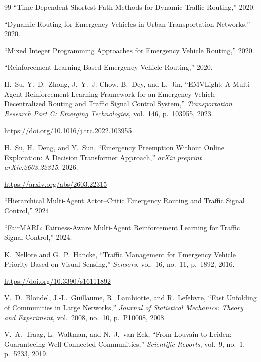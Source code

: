 \documentclass[3p,times]{elsarticle}
\theoremstyle{plain}
\theoremstyle{definition}
\begin{document}
\begin{thebibliography}{99}
``Time-Dependent Shortest Path Methods for Dynamic Traffic
Routing,''
2020.

``Dynamic Routing for Emergency Vehicles in Urban Transportation
Networks,''
2020.

``Mixed Integer Programming Approaches for Emergency Vehicle
Routing,''
2020.

``Reinforcement Learning-Based Emergency Vehicle Routing,''
2020.


H.~Su, Y.~D.~Zhong, J.~Y.~J. Chow, B.~Dey, and L.~Jin,
``EMVLight: A Multi-Agent Reinforcement Learning Framework for an
Emergency Vehicle Decentralized Routing and Traffic Signal Control
System,''
\textit{Transportation Research Part C: Emerging Technologies},
vol.~146, p.~103955, 2023.

\url{https://doi.org/10.1016/j.trc.2022.103955}

H.~Su, H.~Deng, and Y.~Sun,
``Emergency Preemption Without Online Exploration: A Decision
Transformer Approach,''
\textit{arXiv preprint arXiv:2603.22315}, 2026.

\url{https://arxiv.org/abs/2603.22315}

``Hierarchical Multi-Agent Actor--Critic Emergency Routing and
Traffic Signal Control,''
2024.


``FairMARL: Fairness-Aware Multi-Agent Reinforcement Learning for
Traffic Signal Control,''
2024.


K.~Nellore and G.~P.~Hancke,
``Traffic Management for Emergency Vehicle Priority Based on
Visual Sensing,''
\textit{Sensors},
vol.~16, no.~11, p.~1892, 2016.

\url{https://doi.org/10.3390/s16111892}


V.~D.~Blondel, J.-L.~Guillaume, R.~Lambiotte, and R.~Lefebvre,
``Fast Unfolding of Communities in Large Networks,''
\textit{Journal of Statistical Mechanics: Theory and Experiment},
vol.~2008, no.~10, p.~P10008, 2008.

V.~A.~Traag, L.~Waltman, and N.~J.~van Eck,
``From Louvain to Leiden: Guaranteeing Well-Connected
Communities,''
\textit{Scientific Reports},
vol.~9, no.~1, p.~5233, 2019.

\end{thebibliography}
\end{document}
